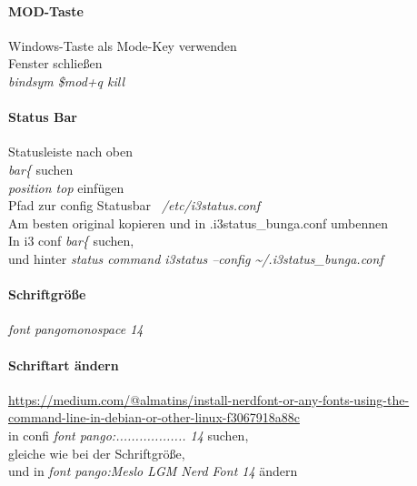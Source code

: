 \documentclass[10pt,a4paper,twoside]{book}
\begin{document}
\paragraph{MOD-Taste} Windows-Taste als Mode-Key verwenden\\
Fenster schließen\\
\textit{bindsym \$mod+q kill}\\ 
\paragraph{Status Bar}
Statusleiste nach oben\\
\textit{bar\{} suchen\\
\textit{position top} einfügen\\ 
Pfad zur config Statusbar \textit{~/etc/i3status.conf}\\
Am besten original kopieren und in .i3status\_bunga.conf umbennen\\
In i3 conf \textit{bar\{} suchen, \\
und hinter \textit{status command i3status --config \textasciitilde/.i3status\_bunga.conf }\\
\paragraph{Schriftgröße}
\textit{font pango\:monospace 14}\\
\paragraph{Schriftart ändern}
\url{https://medium.com/@almatins/install-nerdfont-or-any-fonts-using-the-command-line-in-debian-or-other-linux-f3067918a88c}\\
in confi \textit{font pango:.................. 14} suchen,\\ gleiche wie bei der Schriftgröße,\\ 
und in \textit{font pango:Meslo LGM Nerd Font 14} ändern\\ 
\end{document}
